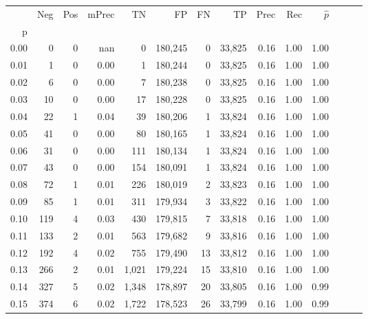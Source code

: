 \begin{tabular}{rrrrrrrrrrrrrr}
\toprule
{} &    Neg &    Pos & mPrec &       TN &       FP &      FN &      TP &  Prec &   Rec & $\hat{p}$ \\
p    &        &        &       &          &          &         &         &       &       &           \\
\midrule
0.00 &      0 &      0 &   nan &        0 &  180,245 &       0 &  33,825 &  0.16 &  1.00 &      1.00 \\
0.01 &      1 &      0 &  0.00 &        1 &  180,244 &       0 &  33,825 &  0.16 &  1.00 &      1.00 \\
0.02 &      6 &      0 &  0.00 &        7 &  180,238 &       0 &  33,825 &  0.16 &  1.00 &      1.00 \\
0.03 &     10 &      0 &  0.00 &       17 &  180,228 &       0 &  33,825 &  0.16 &  1.00 &      1.00 \\
0.04 &     22 &      1 &  0.04 &       39 &  180,206 &       1 &  33,824 &  0.16 &  1.00 &      1.00 \\
0.05 &     41 &      0 &  0.00 &       80 &  180,165 &       1 &  33,824 &  0.16 &  1.00 &      1.00 \\
0.06 &     31 &      0 &  0.00 &      111 &  180,134 &       1 &  33,824 &  0.16 &  1.00 &      1.00 \\
0.07 &     43 &      0 &  0.00 &      154 &  180,091 &       1 &  33,824 &  0.16 &  1.00 &      1.00 \\
0.08 &     72 &      1 &  0.01 &      226 &  180,019 &       2 &  33,823 &  0.16 &  1.00 &      1.00 \\
0.09 &     85 &      1 &  0.01 &      311 &  179,934 &       3 &  33,822 &  0.16 &  1.00 &      1.00 \\
0.10 &    119 &      4 &  0.03 &      430 &  179,815 &       7 &  33,818 &  0.16 &  1.00 &      1.00 \\
0.11 &    133 &      2 &  0.01 &      563 &  179,682 &       9 &  33,816 &  0.16 &  1.00 &      1.00 \\
0.12 &    192 &      4 &  0.02 &      755 &  179,490 &      13 &  33,812 &  0.16 &  1.00 &      1.00 \\
0.13 &    266 &      2 &  0.01 &    1,021 &  179,224 &      15 &  33,810 &  0.16 &  1.00 &      1.00 \\
0.14 &    327 &      5 &  0.02 &    1,348 &  178,897 &      20 &  33,805 &  0.16 &  1.00 &      0.99 \\
0.15 &    374 &      6 &  0.02 &    1,722 &  178,523 &      26 &  33,799 &  0.16 &  1.00 &      0.99 \\

\end{tabular}
